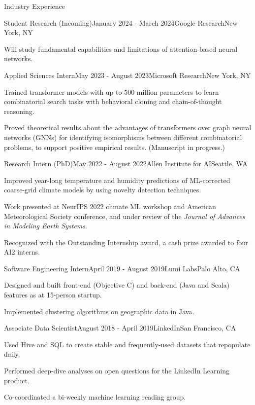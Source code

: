 \documentclass{cv} %
\begin{document}
\begin{rSection}{Industry Experience}

\begin{rSubsection}{Student Research (Incoming)}{January 2024 - March 2024}{Google Research}{New York, NY}
\item Will study fundamental capabilities and limitations of attention-based neural networks.
\end{rSubsection}

\begin{rSubsection}{Applied Sciences Intern}{May 2023 - August 2023}{Microsoft Research}{New York, NY}
\item Trained transformer models with up to 500 million parameters to learn combinatorial search tasks with behavioral cloning and chain-of-thought reasoning.
\item Proved theoretical results about the advantages of transformers over graph neural networks (GNNs) for identifying isomorphisms between different combinatorial problems, to support positive empirical results. (Manuscript in progress.) 
\end{rSubsection}

\begin{rSubsection}{Research Intern (PhD)}{May 2022 - August 2022}{Allen Institute for AI}{Seattle, WA}
\item Improved year-long temperature and humidity predictions of ML-corrected coarse-grid climate models by using novelty detection techniques.
\item Work presented at NeurIPS 2022 climate ML workshop and American Meteorological Society conference, and under review of the \textit{Journal of Advances in Modeling Earth Systems}.
\item Recognized with the Outstanding Internship award, a cash prize awarded to four AI2 interns.
\end{rSubsection}

\begin{rSubsection}{Software Engineering Intern}{April 2019 - August 2019}{Lumi Labs}{Palo Alto, CA}
\item Designed and built front-end (Objective C) and back-end (Java and Scala) features as at 15-person startup.
\item Implemented clustering algorithms on geographic data in Java.
\end{rSubsection}

\begin{rSubsection}{Associate Data Scientist}{August 2018 - April 2019}{LinkedIn}{San Francisco, CA}
\item Used Hive and SQL to create stable and frequently-used datasets that repopulate daily. 
\item Performed deep-dive analyses on open questions for the LinkedIn Learning product.
\item Co-coordinated a bi-weekly machine learning reading group.
\end{rSubsection}


\end{rSection}
\end{document}
